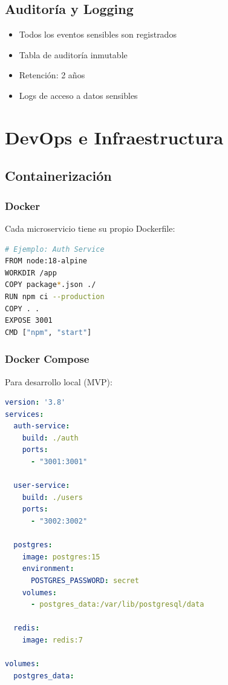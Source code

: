 \documentclass[12pt,a4paper,spanish]{article}
\begin{document}
\subsection{Auditoría y Logging}

\begin{itemize}
    \item Todos los eventos sensibles son registrados
    \item Tabla de auditoría inmutable
    \item Retención: 2 años
    \item Logs de acceso a datos sensibles
\end{itemize}

\newpage

\section{DevOps e Infraestructura}

\subsection{Containerización}

\subsubsection{Docker}

Cada microservicio tiene su propio Dockerfile:

\begin{lstlisting}[language=bash]
# Ejemplo: Auth Service
FROM node:18-alpine
WORKDIR /app
COPY package*.json ./
RUN npm ci --production
COPY . .
EXPOSE 3001
CMD ["npm", "start"]
\end{lstlisting}

\subsubsection{Docker Compose}

Para desarrollo local (MVP):

\begin{lstlisting}[language=yaml]
version: '3.8'
services:
  auth-service:
    build: ./auth
    ports:
      - "3001:3001"

  user-service:
    build: ./users
    ports:
      - "3002:3002"

  postgres:
    image: postgres:15
    environment:
      POSTGRES_PASSWORD: secret
    volumes:
      - postgres_data:/var/lib/postgresql/data

  redis:
    image: redis:7

volumes:
  postgres_data:
\end{lstlisting}
\end{document}
